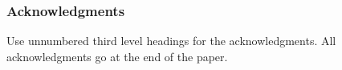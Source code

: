 \documentclass{article}
\newcommand{\OpSym}{\mathrm{O\!p}}
\newcommand{\opsym}{{\scriptstyle \mathrm{o\!p}}}
\newcommand{\OpCurry}[3][]{\mathop{\OpSym^{#1}_{#2}{#3}}}
\newcommand{\opcurry}[3][]{\mathop{\opsym^{#1}_{#2}{#3}}}
\newcommand{\Op}[2][]{\OpCurry[#1]{#2}{}}
\newcommand{\op}[2][]{\opcurry[#1]{#2}{}}
\newcommand{\GNP}{\psi_{\Theta}}
\begin{document}

\subsubsection*{Acknowledgments}

Use unnumbered third level headings for the acknowledgments. All
acknowledgments go at the end of the paper.
\end{document}
